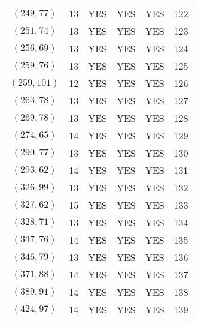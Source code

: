 \begin{longtable}{|c|c|c|c|c|c|}
$(249, 77)$ & 13 & YES & YES & YES & 122\\
$(251, 74)$ & 13 & YES & YES & YES & 123\\
$(256, 69)$ & 13 & YES & YES & YES & 124\\
$(259, 76)$ & 13 & YES & YES & YES & 125\\
$(259, 101)$ & 12 & YES & YES & YES & 126\\
$(263, 78)$ & 13 & YES & YES & YES & 127\\
$(269, 78)$ & 13 & YES & YES & YES & 128\\
$(274, 65)$ & 14 & YES & YES & YES & 129\\
$(290, 77)$ & 13 & YES & YES & YES & 130\\
$(293, 62)$ & 14 & YES & YES & YES & 131\\
$(326, 99)$ & 13 & YES & YES & YES & 132\\
$(327, 62)$ & 15 & YES & YES & YES & 133\\
$(328, 71)$ & 13 & YES & YES & YES & 134\\
$(337, 76)$ & 14 & YES & YES & YES & 135\\
$(346, 79)$ & 13 & YES & YES & YES & 136\\
$(371, 88)$ & 14 & YES & YES & YES & 137\\
$(389, 91)$ & 14 & YES & YES & YES & 138\\
$(424, 97)$ & 14 & YES & YES & YES & 139
\end{longtable}
